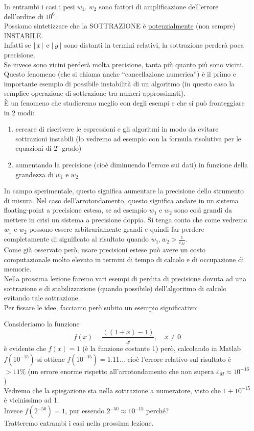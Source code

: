 In entrambi i casi i pesi $w_1$, $w_2$ sono fattori di amplificazione dell'errore dell'ordine di $10^6$.\\
Possiamo sintetizzare che la SOTTRAZIONE è \uline{potenzialmente} (non sempre) \uline{INSTABILE}.\\
Infatti se $\lvert\,x\,\rvert$ e $\lvert\,y\,\rvert$ sono distanti in termini relativi, la sottrazione perderà poca precisione.\\
Se invece sono vicini perderà molta precisione, tanta più quanto più sono vicini.\\
Questo fenomeno (che si chiama anche “cancellazione numerica”) è il primo e importante esempio di possibile instabilità di un algoritmo (in questo caso la semplice operazione di sottrazione tra numeri approssimati).\\
È un fenomeno che studieremo meglio con degli esempi e che si può fronteggiare in 2 modi:
\begin{enumerate}
    \item cercare di riscrivere le espressioni e gli algoritmi in modo da evitare sottrazioni instabili (lo vedremo ad esempio con la formula risolutiva per le equazioni di $2^\circ$ grado)
    \item aumentando la precisione (cioè diminuendo l'errore sui dati) in funzione della grandezza di $w_1$ e $w_2$
\end{enumerate}
In campo sperimentale, questo significa aumentare la precisione dello strumento di misura. Nel caso dell'arrotondamento, questo significa andare in un sistema floating-point a precisione estesa, se ad esempio $w_1$ e $w_2$ sono così grandi da mettere in crisi un sistema a precisione doppia. Si tenga conto che come vedremo $w_1$ e $w_2$ possono essere arbitrariamente grandi e quindi far perdere completamente di significato al risultato quando $w_1, w_2 > \frac{1}{\varepsilon_M}$.\\
Come già osservato però, usare precisioni estese può avere un costo computazionale molto elevato in termini di tempo di calcolo e di occupazione di memorie.\\
Nella prossima lezione faremo vari esempi di perdita di precisione dovuta ad una sottrazione e di stabilizzazione (quando possibile) dell'algoritmo di calcolo evitando tale sottrazione.\\
Per fissare le idee, facciamo però subito un esempio significativo: 
\begin{esempio}\end{esempio}
Consideriamo la funzione
\[f(x) = \frac{((1 + x) - 1)}{x}, \quad x \ne 0\]
è evidente che $f(x) = 1$ (è la funzione costante 1) però, calcolando in Matlab $f(10^{-15})$ si ottiene $f(10^{-15}) = 1.11\dotsc$ cioè l'errore relativo sul risultato è $>11\%$ (un errore enorme rispetto all'arrotondamento che non supera $\varepsilon_M \approx 10^{-16}$)\\
Vedremo che la spiegazione sta nella sottrazione a numeratore, visto che $1+10^{-15}$ è vicinissimo ad 1.\\
Invece $f(2^{-50}) = 1$, pur essendo $2^{-50} \approx 10^{-15}$ perché?\\
Tratteremo entrambi i casi nella prossima lezione.
\newpage
